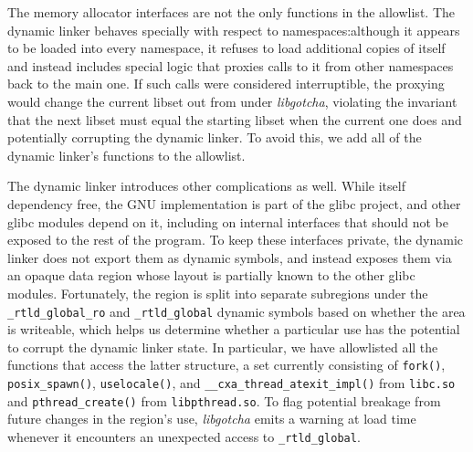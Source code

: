 The memory allocator interfaces are not the only functions in the allowlist.  The
dynamic linker behaves specially with respect to namespaces:\@ although it appears to
be loaded into every namespace, it refuses to load additional copies of itself and
instead includes special logic that proxies calls to it from other namespaces back to
the main one.  If such calls were considered interruptible, the proxying would
change the current libset out from under \textit{libgotcha}, violating the invariant
that the next libset must equal the starting libset when the current one does and
potentially corrupting the dynamic linker.  To
avoid this, we add all of the dynamic linker's functions to the allowlist.

The dynamic linker introduces other complications as well.  While itself dependency
free, the GNU implementation is part of the glibc project, and other glibc modules
depend on it, including on internal interfaces that should not be exposed to the rest
of the program.  To keep these interfaces private, the dynamic linker does not export
them as dynamic symbols, and instead exposes them via an opaque data region whose
layout is partially known to the other glibc modules.  Fortunately, the region is
split into separate subregions under the \texttt{\_rtld\_global\_ro} and
\texttt{\_rtld\_global} dynamic symbols based on whether the area is writeable, which
helps us determine whether a particular use has the potential to corrupt the dynamic
linker state.  In particular, we have allowlisted all the functions that access the
latter structure, a set currently consisting of \texttt{fork()},
\texttt{posix\_spawn()}, \texttt{uselocale()}, and
\texttt{\_\_cxa\_thread\_atexit\_impl()} from \texttt{libc.so} and
\texttt{pthread\_create()} from \texttt{libpthread.so}.  To flag potential breakage
from future changes in the region's use, \textit{libgotcha} emits a warning at load
time whenever it encounters an unexpected access to \texttt{\_rtld\_global}.

